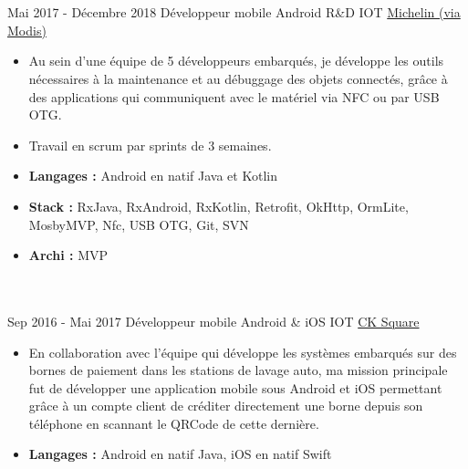 \documentclass[letterpaper]{twentysecondcv} %
\begin{document}
\begin{twenty}
{\begin{itemize}
        \end{itemize}}
        \\ \\
\twentyitem
    	{Mai 2017 -}
		{Décembre 2018}
        {Développeur mobile Android R\&D IOT}
        {\href{http://www.michelin.fr/}{Michelin (via Modis)}}
        {}
        {\begin{itemize}
        \item Au sein d'une équipe de 5 développeurs embarqués, je développe les outils nécessaires à la maintenance et au débuggage des objets connectés, grâce à des applications qui communiquent avec le matériel via NFC ou par USB OTG.
        \item Travail en scrum par sprints de 3 semaines.
        \item   \textbf{Langages : }Android en natif Java et Kotlin
        \item \textbf{Stack :} RxJava, RxAndroid, RxKotlin, Retrofit, OkHttp, OrmLite, MosbyMVP, Nfc, USB OTG, Git, SVN
        \item \textbf{Archi :} MVP
        \end{itemize}}
        \\ \\ 
	\twentyitem
    	{Sep 2016 -}
		{Mai 2017}
        {Développeur mobile Android \& iOS IOT}
        {\href{http://www.cksquare.fr/}{CK Square}}
        {}
        {
        {\begin{itemize}
        \item En collaboration avec l'équipe qui développe les systèmes embarqués sur des bornes de paiement dans les stations de lavage auto, ma mission principale fut de développer une application mobile sous Android et iOS permettant grâce à un compte client de créditer directement une borne depuis son téléphone en scannant le QRCode de cette dernière.
        \item \textbf{Langages : }Android en natif Java, iOS en natif Swift
    \end{itemize}}
        }
   
   
   
\end{twenty}
\end{document}
